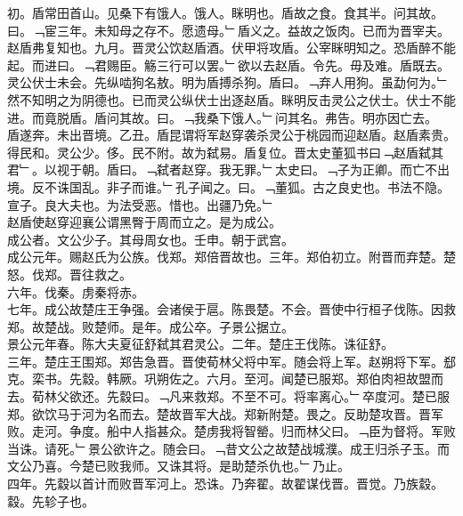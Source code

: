 \documentclass{zhvt-classic}
\begin{document}
\hspace*{2em}初。盾常田首山。见桑下有饿人。饿人。眯明也。盾故之食。食其半。问其故。曰。﹁宦三年。未知母之存不。愿遗母。﹂盾义之。益故之饭肉。已而为晋宰夫。赵盾弗复知也。九月。晋灵公饮赵盾酒。伏甲将攻盾。公宰眯明知之。恐盾醉不能起。而进曰。﹁君赐臣。觞三行可以罢。﹂欲以去赵盾。令先。毋及难。盾既去。灵公伏士未会。先纵啮狗名敖。明为盾搏杀狗。盾曰。﹁弃人用狗。虽勐何为。﹂然不知明之为阴德也。已而灵公纵伏士出逐赵盾。眯明反击灵公之伏士。伏士不能进。而竟脱盾。盾问其故。曰。﹁我桑下饿人。﹂问其名。弗告。明亦因亡去。\\
\hspace*{2em}盾遂奔。未出晋境。乙丑。盾昆谓将军赵穿袭杀灵公于桃园而迎赵盾。赵盾素贵。得民和。灵公少。侈。民不附。故为弑易。盾复位。晋太史董狐书曰﹁赵盾弑其君﹂。以视于朝。盾曰。﹁弑者赵穿。我无罪。﹂太史曰。﹁子为正卿。而亡不出境。反不诛国乱。非子而谁。﹂孔子闻之。曰。﹁董狐。古之良史也。书法不隐。宣子。良大夫也。为法受恶。惜也。出疆乃免。﹂\\
\hspace*{2em}赵盾使赵穿迎襄公谓黑臀于周而立之。是为成公。\\
\hspace*{2em}成公者。文公少子。其母周女也。壬申。朝于武宫。\\
\hspace*{2em}成公元年。赐赵氏为公族。伐郑。郑倍晋故也。三年。郑伯初立。附晋而弃楚。楚怒。伐郑。晋往救之。\\
\hspace*{2em}六年。伐秦。虏秦将赤。\\
\hspace*{2em}七年。成公故楚庄王争强。会诸侯于扈。陈畏楚。不会。晋使中行桓子伐陈。因救郑。故楚战。败楚师。是年。成公卒。子景公据立。\\
\hspace*{2em}景公元年春。陈大夫夏征舒弑其君灵公。二年。楚庄王伐陈。诛征舒。\\
\hspace*{2em}三年。楚庄王围郑。郑告急晋。晋使荀林父将中军。随会将上军。赵朔将下军。郄克。栾书。先縠。韩厥。巩朔佐之。六月。至河。闻楚已服郑。郑伯肉袒故盟而去。荀林父欲还。先縠曰。﹁凡来救郑。不至不可。将率离心。﹂卒度河。楚已服郑。欲饮马于河为名而去。楚故晋军大战。郑新附楚。畏之。反助楚攻晋。晋军败。走河。争度。船中人指甚众。楚虏我将智罃。归而林父曰。﹁臣为督将。军败当诛。请死。﹂景公欲许之。随会曰。﹁昔文公之故楚战城濮。成王归杀子玉。而文公乃喜。今楚已败我师。又诛其将。是助楚杀仇也。﹂乃止。\\
\hspace*{2em}四年。先縠以首计而败晋军河上。恐诛。乃奔翟。故翟谋伐晋。晋觉。乃族縠。縠。先轸子也。\\
\end{document}
